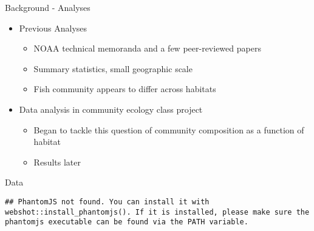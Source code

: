 \documentclass[ignorenonframetext,]{beamer}
\providecommand{\tightlist}{%
  \setlength{\itemsep}{0pt}\setlength{\parskip}{0pt}}
\begin{document}
\begin{frame}{Background - Analyses}

\begin{itemize}
\tightlist
\item
  Previous Analyses

  \begin{itemize}
  \tightlist
  \item
    NOAA technical memoranda and a few peer-reviewed papers
  \item
    Summary statistics, small geographic scale
  \item
    Fish community appears to differ across habitats
  \end{itemize}
\item
  Data analysis in community ecology class project

  \begin{itemize}
  \tightlist
  \item
    Began to tackle this question of community composition as a function
    of habitat
  \item
    Results later
  \end{itemize}
\end{itemize}

\end{frame}

\begin{frame}[fragile]{Data}

\begin{verbatim}
## PhantomJS not found. You can install it with webshot::install_phantomjs(). If it is installed, please make sure the phantomjs executable can be found via the PATH variable.
\end{verbatim}

\hypertarget{htmlwidget-6ffb316bede88b1ceb8f}{}

\end{frame}
\end{document}

